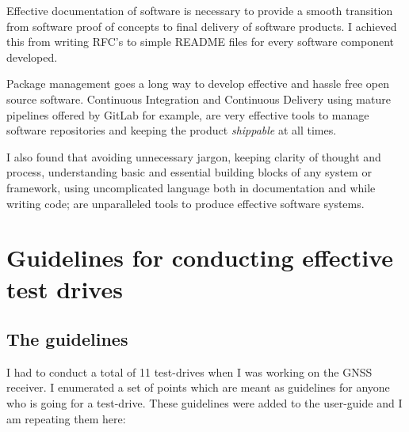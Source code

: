 \documentclass[a4paper, 12pt, oneside]{report}
\begin{document}
  Effective documentation of software is necessary to provide a smooth transition from software proof of concepts to final delivery of software products. I achieved this from writing RFC's to simple README files for every software component developed. 
  
  Package management \cite{CondaCondadocumentation-2019-10-31} goes a long way to develop effective and hassle free open source software. Continuous Integration and Continuous Delivery using mature pipelines \cite{CreatingandusingCICDpipelinesGitLab-2020-02-18} offered by GitLab for example, are very effective tools to manage software repositories and keeping the product \textit{shippable} at all times.
  
  I also found that avoiding unnecessary jargon, keeping clarity of thought and process, understanding basic and essential building blocks of any system or framework, using uncomplicated language both in documentation and while writing code; are unparalleled tools to produce effective software systems. 
  
  \newpage
    
  \appendix
  
  \chapter{Guidelines for conducting effective test drives}
  
  \section{The guidelines}
  \normalsize I had to conduct a total of 11 test-drives when I was working on the GNSS receiver. I enumerated a set of points which are meant as guidelines for anyone who is going for a test-drive. These guidelines were added to the user-guide \cite{IntroductionStudentGuide-2020-01-20} and I am repeating them here:
  
\end{document}
